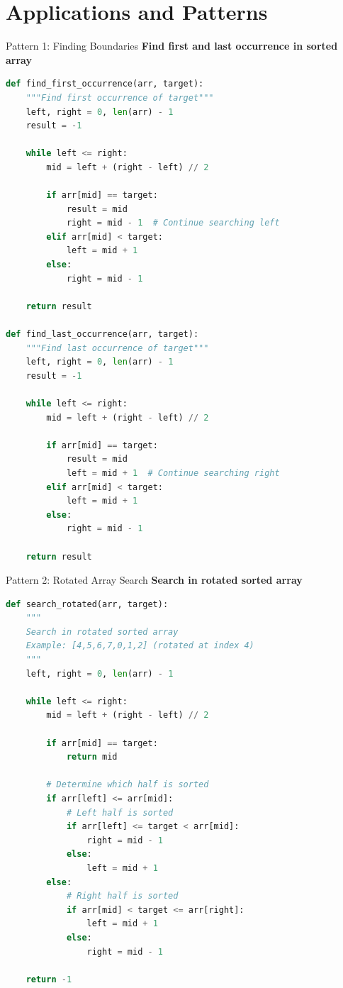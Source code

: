 \documentclass[aspectratio=169]{beamer}
\begin{document}
\section{Applications and Patterns}

\begin{frame}[fragile]{Pattern 1: Finding Boundaries}
\textbf{Find first and last occurrence in sorted array}

\begin{lstlisting}[language=Python, basicstyle=\ttfamily\tiny]
def find_first_occurrence(arr, target):
    """Find first occurrence of target"""
    left, right = 0, len(arr) - 1
    result = -1

    while left <= right:
        mid = left + (right - left) // 2

        if arr[mid] == target:
            result = mid
            right = mid - 1  # Continue searching left
        elif arr[mid] < target:
            left = mid + 1
        else:
            right = mid - 1

    return result

def find_last_occurrence(arr, target):
    """Find last occurrence of target"""
    left, right = 0, len(arr) - 1
    result = -1

    while left <= right:
        mid = left + (right - left) // 2

        if arr[mid] == target:
            result = mid
            left = mid + 1  # Continue searching right
        elif arr[mid] < target:
            left = mid + 1
        else:
            right = mid - 1

    return result
\end{lstlisting}
\end{frame}

\begin{frame}[fragile]{Pattern 2: Rotated Array Search}
\textbf{Search in rotated sorted array}

\begin{lstlisting}[language=Python, basicstyle=\ttfamily\tiny]
def search_rotated(arr, target):
    """
    Search in rotated sorted array
    Example: [4,5,6,7,0,1,2] (rotated at index 4)
    """
    left, right = 0, len(arr) - 1

    while left <= right:
        mid = left + (right - left) // 2

        if arr[mid] == target:
            return mid

        # Determine which half is sorted
        if arr[left] <= arr[mid]:
            # Left half is sorted
            if arr[left] <= target < arr[mid]:
                right = mid - 1
            else:
                left = mid + 1
        else:
            # Right half is sorted
            if arr[mid] < target <= arr[right]:
                left = mid + 1
            else:
                right = mid - 1

    return -1
\end{lstlisting}
\end{frame}
\end{document}
